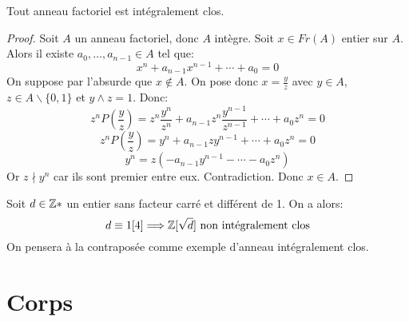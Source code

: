 \begin{proposition}{}{}
    Tout anneau factoriel est intégralement clos.
\end{proposition}

\begin{proof}
    Soit $A$ un anneau factoriel, donc $A$ intègre. \newline
    Soit $x \in Fr(A)$ entier sur $A$. Alors il existe $a_0, \dots, a_{n-1} \in A$ tel que: 
    \[x^n + a_{n-1}x^{n-1} + \cdots + a_0 = 0\]
    On suppose par l'absurde que $x \notin A$. \newline
    On pose donc $x = \frac{y}{z}$ avec $y \in A$, $z \in A \backslash \{0,1\}$ et $y \wedge z = 1$.
    Donc:
    \[ z^n P(\frac{y}{z}) = z^n \frac{y^n}{z^n} + a_{n-1} z^n \frac{y^{n-1}}{z^{n-1}} + \cdots + a_0 z^n = 0 \]
    \[ z^n P(\frac{y}{z}) = y^n + a_{n-1} z y^{n-1} + \cdots + a_0 z^n = 0\]
    \[ y^n = z (- a_{n-1} y^{n-1} - \cdots - a_0 z^n) \]
    Or $z \nmid y^n$ car ils sont premier entre eux. Contradiction. Donc $x \in A$.
\end{proof}

\begin{example}{}{}
    Soit $d \in \mathbb{Z}*$ un entier sans facteur carré et différent de 1. On a alors:
    \[ d \equiv 1 [4] \Longrightarrow \mathbb{Z}[\sqrt{d}] ~ \text{non intégralement clos} \]
    On pensera à la contraposée comme exemple d'anneau intégralement clos.
\end{example}



\newpage

\section{Corps}

\subsection{}
